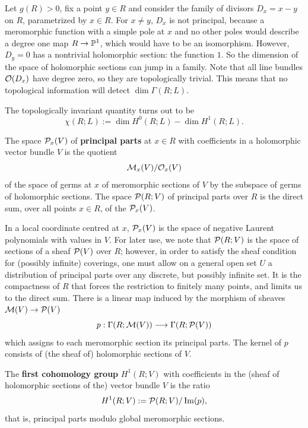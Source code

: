 \documentclass[12pt]{article}
\begin{document}
\begin{example}
    Let $g(R)>0$, fix a point $y\in R$ and consider the family of divisors
    $D_x = x - y$ on $R$, parametrized by $x\in R$.
    For $x\neq y$, $D_x$ is not principal, because a meromorphic function
    with a simple pole at $x$ and no other poles would describe a degree one map
    $R\to\P^1$, which would have to be an isomorphism.
    However, $D_y = 0$ has a nontrivial holomorphic section: the function $1$.
    So the dimension of the space of holomorphic sections can jump in a family.
    Note that all line bundles $\cO(D_x)$ have degree zero, so they are
    topologically trivial.
    This means that no topological information will detect $\dim\Gamma(R;L)$.
\end{example}
The topologically invariant quantity turns out to be
\[
    \chi(R;L) := \dim H^0(R;L) - \dim H^1(R;L).
\]
\begin{definition}
    The space $\cP_x(V)$ of \textbf{principal parts} at $x\in R$ with coefficients in a
    holomorphic vector bundle $V$ is the quotient
    \[
        \cM_x(V)/\cO_x(V)
    \]
    of the space of germs at $x$ of meromorphic sections of $V$ by the subspace of
    germs of holomorphic sections.
    The space $\cP(R;V)$ of principal parts over $R$ is the direct sum, over all
    points $x\in R$, of the $\cP_x(V)$.
\end{definition}


In a local coordinate centred at $x$, $\cP_x(V)$ is the space of negative
Laurent polynomials with values in $V$.
For later use, we note that $\cP(R;V)$ is the space of sections of a sheaf
$\cP(V)$ over $R$; however, in order to satisfy the sheaf condition for
(possibly infinite) coverings, one must allow on a general open set $U$ a
distribution of principal parts over any discrete, but possibly infinite set.
It is the compactness of $R$ that forces the restriction to finitely many
points, and limits us to the direct sum.
There is a linear map induced by the morphism of sheaves $\cM(V) \to \cP(V)$
\[
    p : \Gamma(R;\cM(V)) \longrightarrow \Gamma(R;\cP(V))
\]
which assigns to each meromorphic section its principal parts. The kernel of $p$ consists of (the sheaf of) holomorphic sections of $V$.

\begin{definition}
    The \textbf{first cohomology group} $H^{1}(R;V)$ with coefficients in the
    (sheaf of holomorphic sections of the) vector bundle $V$ is the ratio
    \[
        H^{1}(R;V) := \cP(R;V)/\operatorname{Im}(p),
    \]
    that is, principal parts modulo global meromorphic sections.
\end{definition}
\end{document}
